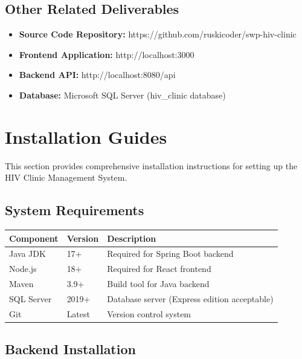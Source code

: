\documentclass[12pt,a4paper]{article}
\begin{document}
\subsection{Other Related Deliverables}

\begin{itemize}
    \item \textbf{Source Code Repository:} https://github.com/ruskicoder/swp-hiv-clinic
    \item \textbf{Frontend Application:} http://localhost:3000
    \item \textbf{Backend API:} http://localhost:8080/api
    \item \textbf{Database:} Microsoft SQL Server (hiv\_clinic database)
\end{itemize}

\section{Installation Guides}

This section provides comprehensive installation instructions for setting up the HIV Clinic Management System.

\subsection{System Requirements}

\begin{longtable}{@{}|p{3cm}|p{3cm}|p{8cm}|@{}}
\hline
\textbf{Component} & \textbf{Version} & \textbf{Description} \\
\hline
Java JDK & 17+ & Required for Spring Boot backend \\
\hline
Node.js & 18+ & Required for React frontend \\
\hline
Maven & 3.9+ & Build tool for Java backend \\
\hline
SQL Server & 2019+ & Database server (Express edition acceptable) \\
\hline
Git & Latest & Version control system \\
\hline
\end{longtable}

\subsection{Backend Installation}
\end{document}

